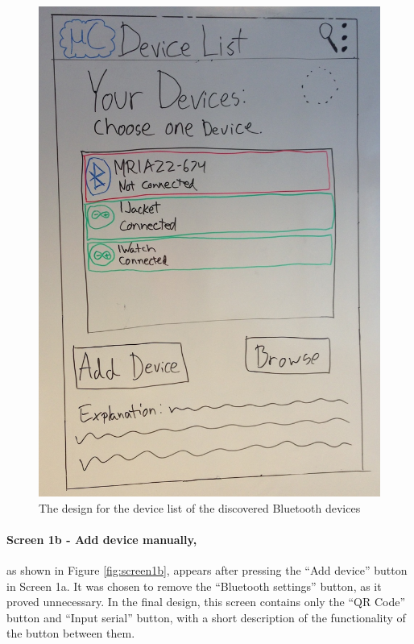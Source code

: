\begin{figure}[H]
	\centering
		\includegraphics[scale=0.2]{images/Design_guide/Screen1a.png}
	\caption[Screen 1a - Device list]{The design for the device list of the discovered Bluetooth devices}
	\label{fig:screen1a}
\end{figure}


\paragraph{Screen 1b - Add device manually,} as shown in Figure \ref{fig:screen1b}, appears after pressing the ``Add device'' button in Screen 1a. It was chosen to remove the ``Bluetooth settings'' button, as it proved unnecessary. In the final design, this screen contains only the ``QR Code'' button and ``Input serial'' button, with a short description of the functionality of the button between them.

